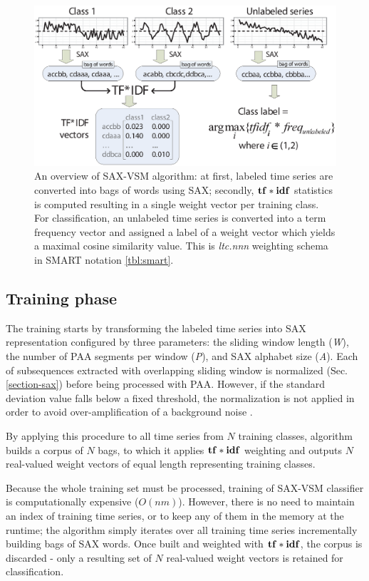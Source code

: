 \begin{figure}[t]
   \centering
   \includegraphics[width=140mm]{figures/overview.eps}
   \caption{
   An overview of SAX-VSM algorithm: 
   at first, labeled time series are converted into bags of words using SAX; 
   secondly, $\text{\textbf{tf}}\ast\text{\textbf{idf}}$ statistics is computed resulting in 
   a single weight vector per training class. For classification, an unlabeled 
   time series is converted into a term frequency vector and assigned a 
   label of a weight vector which yields a maximal cosine similarity value.
   This is \textit{ltc.nnn} weighting schema in SMART notation \ref{tbl:smart}.}
   \label{fig:sax-vsm_overview}
\end{figure}

\subsection{Training phase}
The training starts by transforming the labeled time series into SAX representation
configured by three parameters: the sliding window length (\textit{W}), 
the number of PAA segments per window (\textit{P}), 
and SAX alphabet size (\textit{A}).
Each of subsequences extracted with overlapping sliding window 
is normalized (Sec. \ref{section-sax}) before being processed with PAA. 
However, if the standard deviation value falls below a fixed threshold, the 
normalization is not applied in order to avoid over-amplification 
of a background noise \cite{sax}. 

By applying this procedure to all time series from $N$ training classes, 
algorithm builds a corpus of $N$ bags, to which it applies $\text{\textbf{tf}}\ast\text{\textbf{idf}}$ 
weighting and outputs $N$ real-valued weight vectors of equal length 
representing training classes. 

Because the whole training set must be processed, 
training of SAX-VSM classifier is computationally expensive ($O(nm)$). 
However, there is no need to maintain an index of training time series, 
or to keep any of them in the memory at the runtime;
the algorithm simply iterates over all training time series incrementally building 
bags of SAX words. Once built and weighted with $\text{\textbf{tf}}\ast\text{\textbf{idf}}$, 
the corpus is discarded - only a resulting set of $N$ real-valued weight vectors 
is retained for classification. 

